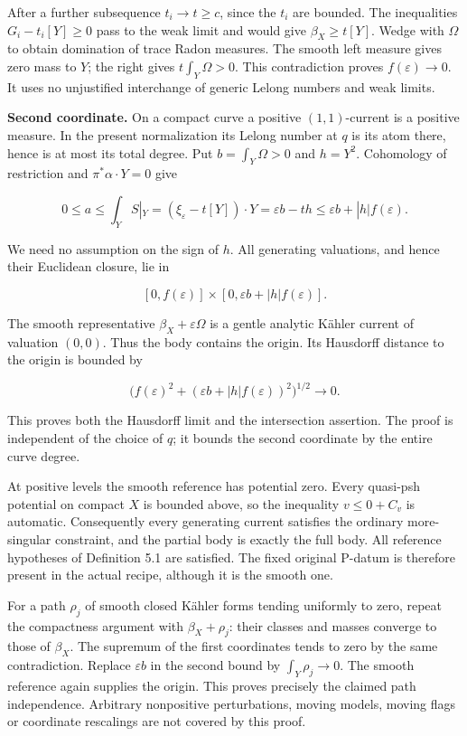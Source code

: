\documentclass[11pt]{article}
\begin{document}
After a further subsequence $t_i\to t\geq c$, since the $t_i$ are bounded. The inequalities $G_i-t_i[Y]\geq0$ pass to the weak limit and would give $\beta_X\geq t[Y]$. Wedge with $\Omega$ to obtain domination of trace Radon measures. The smooth left measure gives zero mass to $Y$; the right gives $t\int_Y\Omega>0$. This contradiction proves $f(\varepsilon)\to0$. It uses no unjustified interchange of generic Lelong numbers and weak limits.

\textbf{Second coordinate.} On a compact curve a positive $(1,1)$-\allowbreak{}current is a positive measure. In the present normalization its Lelong number at $q$ is its atom there, hence is at most its total degree. Put $b=\int_Y\Omega>0$ and $h=Y^2$. Cohomology of restriction and $\pi^*\alpha\cdot Y=0$ give

\[0\leq a\leq\int_Y S|_Y=(\xi_\varepsilon-t[Y])\cdot Y=\varepsilon b-th\leq\varepsilon b+|h|f(\varepsilon).\]

We need no assumption on the sign of $h$. All generating valuations, and hence their Euclidean closure, lie in

\[[0,f(\varepsilon)]\times[0,\varepsilon b+|h|f(\varepsilon)].\]

The smooth representative $\beta_X+\varepsilon\Omega$ is a gentle analytic Kähler current of valuation $(0,0)$. Thus the body contains the origin. Its Hausdorff distance to the origin is bounded by

\[\big(f(\varepsilon)^2+(\varepsilon b+|h|f(\varepsilon))^2\big)^{1/2}\longrightarrow0.\]

This proves both the Hausdorff limit and the intersection assertion. The proof is independent of the choice of $q$; it bounds the second coordinate by the entire curve degree.

At positive levels the smooth reference has potential zero. Every quasi-\allowbreak{}psh potential on compact $X$ is bounded above, so the inequality $v\leq0+C_v$ is automatic. Consequently every generating current satisfies the ordinary more-\allowbreak{}singular constraint, and the partial body is exactly the full body. All reference hypotheses of Definition 5.1 are satisfied. The fixed original P-\allowbreak{}datum is therefore present in the actual recipe, although it is the smooth one.

For a path $\rho_j$ of smooth closed Kähler forms tending uniformly to zero, repeat the compactness argument with $\beta_X+\rho_j$: their classes and masses converge to those of $\beta_X$. The supremum of the first coordinates tends to zero by the same contradiction. Replace $\varepsilon b$ in the second bound by $\int_Y\rho_j\to0$. The smooth reference again supplies the origin. This proves precisely the claimed path independence. Arbitrary nonpositive perturbations, moving models, moving flags or coordinate rescalings are not covered by this proof.
\end{document}
